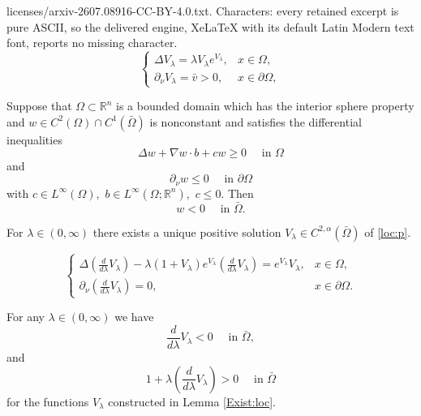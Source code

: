 \documentclass[10pt,a4paper]{amsart}
\def\na{\nabla}
\begin{document}
licenses/arxiv-2607.08916-CC-BY-4.0.txt. Characters: every retained excerpt is pure ASCII, so the delivered engine, XeLaTeX with its default Latin Modern text font, reports no missing character.
\begin{equation}\label{loc:p}
\left\{\begin{array}{lr}
\Delta V_\lambda=\lambda V_\lambda e^{V_\lambda},& x\in\Omega,\\
\partial_\nu V_\lambda=\bar{v}>0,& x\in\partial\Omega, 
\end{array}\right.
\end{equation}

\begin{lemma}\label{MP:lem}
	Suppose that $\Omega\subset\mathbb{R}^n$ is a bounded domain which has the interior sphere property and $w\in C^2(\Omega)\cap C^1(\bar{\Omega})$ is nonconstant and satisfies the differential inequalities
	\begin{equation}\label{MP:ineq}
		\Delta w+\na w\cdot b+ cw\geq 0\quad \text{ in }\Omega 
	\end{equation} 
	and 
	\begin{equation}\label{MP:dird}
		\partial_{\nu}w \leq 0 \quad \text{ in }\partial\Omega 
	\end{equation}  
	with $c\in L^\infty(\Omega),$ $b\in L^\infty(\Omega;\mathbb{R}^n),$ $c\leq 0$. Then
	\begin{equation}\label{MP:neg}
		w < 0 \quad \text{ in }\bar{\Omega}.
	\end{equation}
\end{lemma}

\begin{lemma}\label{Exist:loc}
For $\lambda\in(0,\infty)$ there exists a unique positive solution $V_\lambda\in C^{2,\alpha}(\bar{\Omega})$ of \eqref{loc:p}.
\end{lemma} 

\begin{equation}\label{V:lam:der}
\left\{\begin{array}{lr}
\Delta \left(\frac{d}{d\lambda}V_{\lambda}\right)-\lambda(1+V_\lambda)e^{V_\lambda}\left(\frac{d}{d\lambda}V_{\lambda}\right)=e^{V_\lambda}V_\lambda,& x\in\Omega,\\
\partial_\nu \left(\frac{d}{d\lambda}V_{\lambda}\right)=0,& x\in\partial\Omega. 
\end{array}\right.
\end{equation}

\begin{lemma}\label{V:lem}
For any $\lambda\in(0,\infty)$ we have
\begin{equation}\label{V:pr:1}
 \frac{d}{d\lambda}V_{\lambda}<0\quad \text{ in }  \bar{\Omega},
\end{equation}
and
\begin{equation}\label{V:pr:2}
1+\lambda \left(\frac{d}{d\lambda}V_{\lambda}\right)>0\quad \text{ in }  \bar{\Omega}
\end{equation} 
for the functions $V_\lambda$ constructed in Lemma \ref{Exist:loc}.
\end{lemma}
\end{document}
